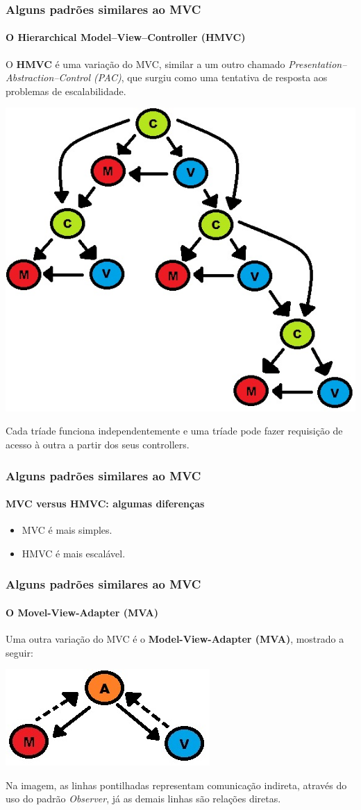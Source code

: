 \documentclass{beamer}
\begin{document}
\begin{frame}
\frametitle{Alguns padrões similares ao MVC}
\framesubtitle{O Hierarchical Model–View–Controller (HMVC)}
	O \textbf{HMVC} é uma variação do MVC, similar a um outro chamado \textit{Presentation–Abstraction–Control (PAC)}, que surgiu como uma tentativa de resposta aos problemas de escalabilidade.
	\begin{center}
		\includegraphics[scale=0.175]{HMVC.jpg}
	\end{center}
	Cada tríade funciona independentemente e uma tríade pode fazer requisição de acesso à outra a partir dos seus controllers.
\end{frame}

\begin{frame}
\frametitle{Alguns padrões similares ao MVC}
\framesubtitle{MVC versus HMVC: algumas diferenças}
	\begin{itemize}
	\item MVC é mais simples.
	\item HMVC é mais escalável.
\end{itemize}
\end{frame}

\begin{frame}
\frametitle{Alguns padrões similares ao MVC}
\framesubtitle{O Movel-View-Adapter (MVA)}
	Uma outra variação do MVC é o \textbf{Model-View-Adapter (MVA)}, mostrado a seguir:
	\begin{center}
		\includegraphics[scale=0.4]{MVA.jpg}
	\end{center}
	Na imagem, as linhas pontilhadas representam comunicação indireta, através do uso do padrão \textit{Observer}, já as demais linhas são relações diretas.
\end{frame}
\end{document}
